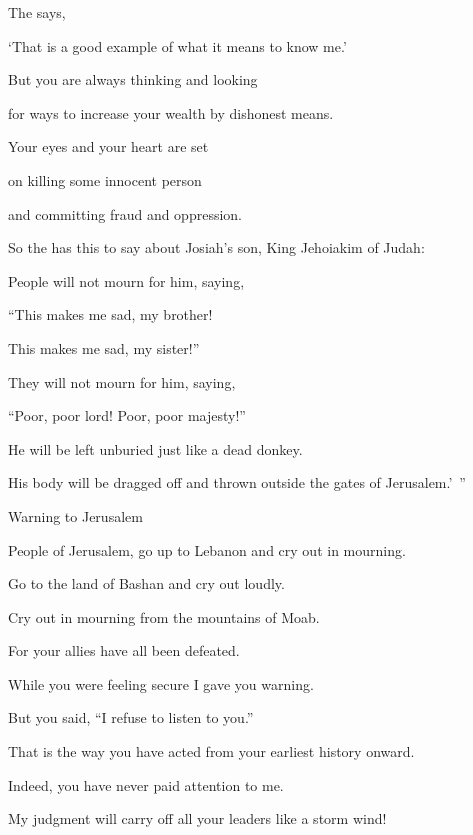 {\par }{\Q The
{}
says,
\par }{\Q ‘That
is a good
example of what it
means to know me.’
\par }{\Q {}But
you are always thinking and looking
\par }{\Q for
ways to increase your wealth by dishonest means.
\par }{\Q Your eyes
and your heart
are set
\par }{\Q on
killing
some innocent
person
\par }{\Q and committing fraud
and oppression.
\par }{\Q {}So
the {}
has this
to say
about Josiah’s
son,
King
Jehoiakim
of Judah:
\par }{\Q People will not
mourn
for him, saying,
\par }{\Q “This makes me sad,
my brother!
\par }{\Q This makes me sad,
my sister!”
\par }{\Q They will not
mourn
for him, saying,
\par }{\Q “Poor, poor lord! Poor, poor majesty!”
\par }{\Q {}He will be left unburied
just like a dead donkey.
\par }{\Q His body will be dragged off
and thrown
outside
the gates
of Jerusalem.’ ”
\par }{\SH Warning to Jerusalem
\par }{\Q {}People of Jerusalem, go up
to Lebanon
and cry out
in mourning.
\par }{\Q Go to the land of Bashan
and cry out loudly.
\par }{\Q Cry out
in mourning from the mountains of Moab.
\par }{\Q For
your allies
have all
been defeated.
\par }{\Q {}While you were feeling
secure I gave you warning.

\par }{\Q But
you said,
“I refuse
to
listen
to you.”
\par }{\Q That is
the way
you have acted from your earliest
history
onward.

\par }{\Q Indeed,
you have never
paid attention
to me.
\par }{\Q {}My judgment will carry off all
your leaders
like a storm
wind!

}
